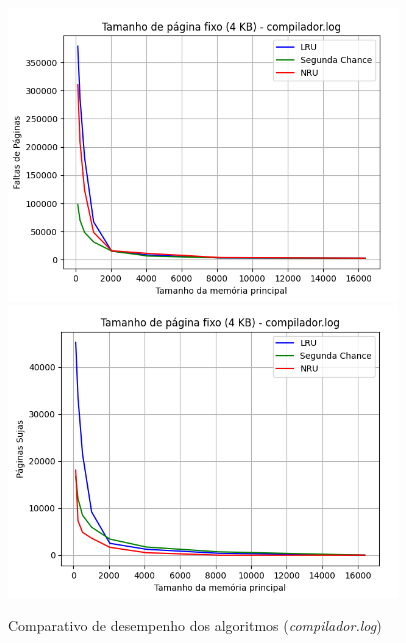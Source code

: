 \documentclass[a4paper, 12pt]{article}
\begin{document}
\begin{figure}[H]
    \centering
    \includegraphics[width=0.92\textwidth]{fixed_pag/compilador/fault.png}
    \hspace{1.5cm}
    \includegraphics[width=0.92\textwidth]{fixed_pag/compilador/write.png}
    \caption{Comparativo de desempenho dos algoritmos (\emph{compilador.log})}
    \label{fig:exampleFig6}
\end{figure}
\end{document}
